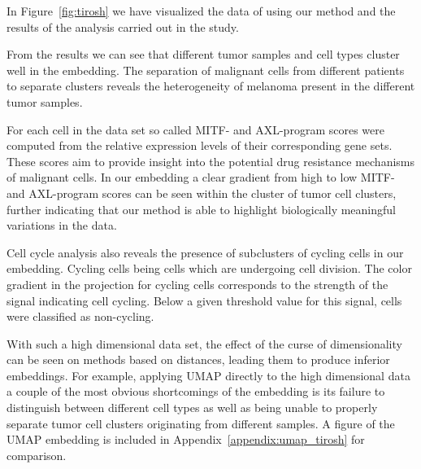 In Figure~\ref{fig:tirosh} we have visualized the data of \cite{tirosh} using our method and the results of the analysis carried out in the study.

From the results we can see that different tumor samples and cell types cluster well in the embedding. The separation of malignant cells from different patients to separate clusters reveals the heterogeneity of melanoma present in the different tumor samples.

For each cell in the data set so called MITF- and AXL-program scores were computed from the relative expression levels of their corresponding gene sets. These scores aim to provide insight into the potential drug resistance mechanisms of malignant cells. In our embedding a clear gradient from high to low MITF- and AXL-program scores can be seen within the cluster of tumor cell clusters, further indicating that our method is able to highlight biologically meaningful variations in the data.

Cell cycle analysis also reveals the presence of subclusters of cycling cells in our embedding. Cycling cells being cells which are undergoing cell division. The color gradient in the projection for cycling cells corresponds to the strength of the signal indicating cell cycling. Below a given threshold value for this signal, cells were classified as non-cycling.

With such a high dimensional data set, the effect of the curse of dimensionality can be seen on methods based on distances, leading them to produce inferior embeddings. For example, applying UMAP directly to the high dimensional data a couple of the most obvious shortcomings of the embedding is its failure to distinguish between different cell types as well as being unable to properly separate tumor cell clusters originating from different samples. A figure of the UMAP embedding is included in Appendix~\ref{appendix:umap_tirosh} for comparison.

